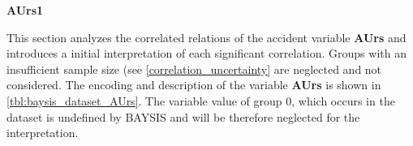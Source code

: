 \Large
\centerline{\textbf{AUrs1}}
\normalsize
This section analyzes the correlated relations of the accident variable \textbf{AUrs} and introduces a initial interpretation of each significant correlation. Groups with an insufficient sample size (see \cref{correlation_uncertainty} are neglected and not considered. The encoding and description of the variable \textbf{AUrs} is shown in \cref{tbl:baysis_dataset_AUrs}. The variable value of group 0, which occurs in the dataset is undefined by BAYSIS and will be therefore neglected for the interpretation.

